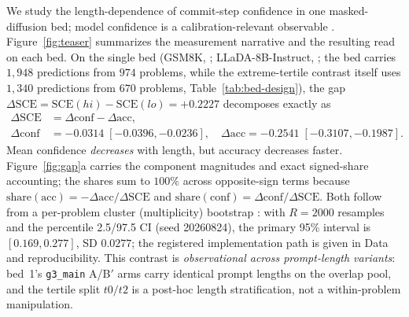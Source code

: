 \documentclass{article}
\begin{document}
We study the length-dependence of commit-step confidence in one masked-diffusion
bed; model confidence is a calibration-relevant observable
\citep{kadavath2022language}.  Figure~\ref{fig:teaser}
summarizes the measurement narrative and the resulting read on each bed.  On the single bed
(GSM8K, \citealp{cobbe2021gsm8k}; LLaDA-8B-Instruct, \citealp{nie2025large}; the bed
carries $1{,}948$ predictions from $974$ problems, while the extreme-tertile
contrast itself uses $1{,}340$ predictions from $670$ problems,
Table~\ref{tab:bed-design}), the gap
$\Delta\mathrm{SCE}=\mathrm{SCE}(hi)-\mathrm{SCE}(lo)=+0.2227$ decomposes exactly as
\[
\begin{aligned}
\Delta\mathrm{SCE}&=\Delta\mathrm{conf}-\Delta\mathrm{acc},\\
\Delta\mathrm{conf}&=-0.0314\;[-0.0396,-0.0236],\quad
\Delta\mathrm{acc}=-0.2541\;[-0.3107,-0.1987].
\end{aligned}
\]
Mean confidence \emph{decreases} with length, but accuracy decreases faster.
Figure~\ref{fig:gap}a carries the component magnitudes and exact signed-share
accounting; the shares sum to $100\%$ across opposite-sign terms because
$\mathrm{share(acc)}=-\Delta\mathrm{acc}/\Delta\mathrm{SCE}$ and
$\mathrm{share(conf)}=\Delta\mathrm{conf}/\Delta\mathrm{SCE}$.  Both follow from a
per-problem cluster (multiplicity) bootstrap \citep{davison1997bootstrap}:
with $R=2000$ resamples and the percentile 2.5/97.5 CI (seed 20260824), the primary
95\% interval is $[0.169,0.277]$, SD $0.0277$; the registered implementation path is
given in Data and reproducibility.  This contrast is \emph{observational across
prompt-length variants}: bed~1's \texttt{g3\_main} A/B$'$ arms carry identical
prompt lengths on the overlap pool, and the tertile split $t0/t2$ is a post-hoc
length stratification, not a within-problem manipulation.
\end{document}
